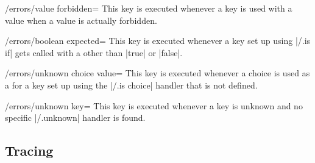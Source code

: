 \begin{key}{/errors/value forbidden=}
    This key is executed whenever a key is used with a value when a value is
    actually forbidden.
\end{key}

\begin{key}{/errors/boolean expected=}
    This key is executed whenever a key set up using |/.is if| gets called with
    a  other than |true| or |false|.
\end{key}

\begin{key}{/errors/unknown choice value=}
    This key is executed whenever a choice is used as a  for a key
    set up using the |/.is choice| handler that is not defined.
\end{key}

\begin{key}{/errors/unknown key=}
    This key is executed whenever a key is unknown and no specific |/.unknown|
    handler is found.
\end{key}





\subsection{Tracing}

